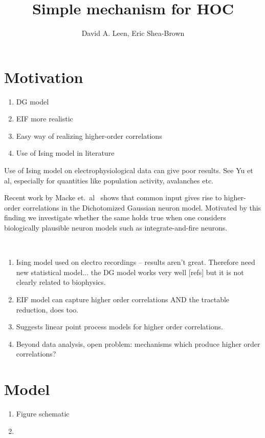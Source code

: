 \documentclass[11pt]{article}
\title{Simple mechanism for HOC}
\author{David A. Leen, Eric Shea-Brown}
\begin{document}
\maketitle
\section{Motivation} %
\begin{enumerate}
\item DG model
\item EIF more realistic
\item Easy way of realizing higher-order correlations
\item Use of Ising model in literature
\end{enumerate}

Use of Ising model on electrophysiological data can give poor results. See Yu et al, especially for quantities like population activity, avalanches etc.

Recent work by Macke et.~al~\cite{Macke:2011gw} shows that common input gives rise to higher-order correlations in the Dichotomized Gaussian neuron model. Motivated by this finding we investigate whether the same holds true when one considers biologically plausible neuron models such as integrate-and-fire neurons.

~\cite{Barreiro:2010ud}

\begin{enumerate}
\item Ising model used on electro recordings -- results aren't great. Therefore need new statistical model... the DG model works very well [refs] but it is not clearly related to biophysics.
\item EIF model can capture higher order correlations AND the tractable reduction, does too.
\item Suggests linear point process models for higher order correlations.
\item Beyond data analysis, open problem: mechanisms which produce higher order correlations?
\end{enumerate}


\section{Model} %
\begin{enumerate}
\item Figure schematic
\item 
\end{enumerate}
\end{document}
